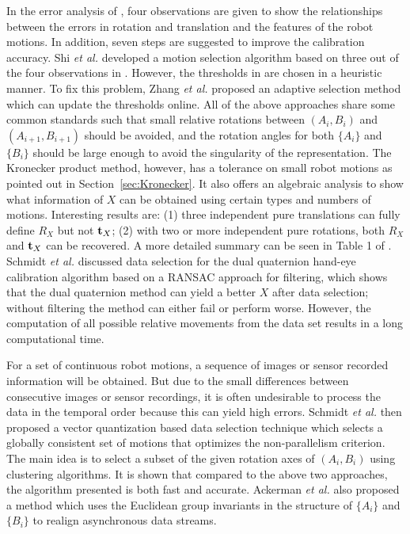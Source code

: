 \documentclass[twocolumn,10pt]{asme2ej}
\newcommand{\ttt}{{\bf t}}
\begin{document}
In the error analysis of \cite{tsai1989new}, four observations are given to show the relationships between the errors in rotation and translation and the features of the robot motions. In addition, seven steps are suggested to improve the calibration accuracy. Shi {\it{et al.}} \cite{shi2005approach} developed a motion selection algorithm based on three out of the four observations in \cite{tsai1989new}. However, the thresholds in \cite{shi2005approach} are chosen in a heuristic manner. To fix this problem,  Zhang {\it{et al.}} \cite{zhang2005adaptive} proposed an adaptive selection method which can update the thresholds online. All of the above approaches share some common standards such that small relative rotations between $(A_i, B_i)$ and $(A_{i+1}, B_{i+1})$ should be avoided, and the rotation angles for both $\{A_i\}$ and $\{B_i\}$ should be large enough to avoid the singularity of the representation. The Kronecker product method, however, has a tolerance on small robot motions as pointed out in Section~\ref{sec:Kronecker}. It also offers an algebraic analysis to show what information of $X$ can be obtained using certain types and numbers of motions. Interesting results are: (1) three independent pure translations can fully define $R_X$ but not $\ttt_{X}$; (2) with two or more independent pure rotations, both $R_{X}$ and $\ttt_{X}$ can be recovered. A more detailed summary can be seen in Table 1 of \cite{andreff1999line}. Schmidt {\it{et al.}} \cite{schmidt2003robust} discussed data selection for the dual quaternion hand-eye calibration algorithm based on a RANSAC approach for filtering, which shows that the dual quaternion method can yield a better $X$ after data selection; without filtering the method can either fail or perform worse. However, the computation of all possible relative movements from the data set results in a long computational time. 

For a set of continuous robot motions, a sequence of images or sensor recorded information will be obtained. But due to the small differences between consecutive images or sensor recordings, it is often undesirable to process the data in the temporal order because this can yield high errors. Schmidt {\it{et al.}} \cite{vogt2004vector} then proposed a vector quantization based data selection technique which selects a globally consistent set of motions that optimizes the non-parallelism criterion. The main idea is to select a subset of the given rotation axes of $(A_i, B_i)$ using clustering algorithms. It is shown that compared to the above two approaches, the algorithm presented is both fast and accurate. Ackerman {\it{et al.}} \cite{ackermanIROS2013} also proposed a method which uses the Euclidean group invariants in the structure of $\{A_i\}$ and $\{B_i\}$ to realign asynchronous data streams.
\end{document}
